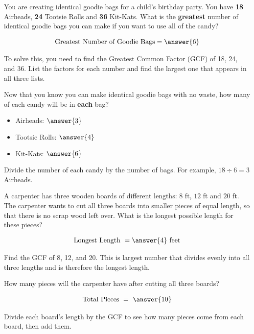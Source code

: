 \documentclass{ximera}[font=12pt]  %
\begin{document}
\begin{problem}
  You are creating identical goodie bags for a child's birthday party.  You have \textbf{18} Airheads, \textbf{24} Tootsie Rolls and
  \textbf{36} Kit-Kats.  What is the \textbf{greatest} number of identical goodie bags you can make if you want to use all of the candy?

  \[ \textrm{Greatest Number of Goodie Bags} = \answer{6} \] 

  \begin{hint}
    To solve this, you need to find the Greatest Common Factor (GCF) of 18, 24, and 36.  List the factors for each number and find the 
    largest one that appears in all three lists.
  \end{hint}

  Now that you know you can make identical goodie bags with no waste, how many of each candy will be in \textbf{each} bag?

  \begin{itemize}
      \item Airheads: $\answer{3}$
      \item Tootsie Rolls: $\answer{4}$
      \item Kit-Kats: $\answer{6}$
  \end{itemize}
  
  \begin{hint}
    Divide the number of each candy by the number of bags.  For example, $18 \div 6 = 3$ Airheads.
  \end{hint}


\end{problem}


\begin{problem}
  A carpenter has three wooden boards of different lengths: $8$ ft, $12$ ft and
      $20$ ft.  The carpenter wants to cut all three boards into smaller pieces of equal length,
       so that there is no scrap wood left over.  What is the longest possible length for these pieces?

  \[ \textrm{Longest Length } = \answer{4} \ \textrm{feet} \] 

  \begin{hint}
    Find the GCF of 8, 12, and 20.  This is largest number that divides evenly into all three lengths and is therefore the longest length.
  \end{hint}

How many pieces will the carpenter have after cutting all three boards?

  \[ \textrm{Total Pieces } = \ \answer{10} \] 

  \begin{hint}
    Divide each board's length by the GCF to see how many pieces come from each board, then add them.
  \end{hint}
\end{problem}
\end{document}
